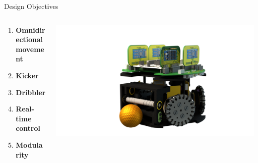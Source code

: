 \begin{frame}{Design Objectives}
	\begin{columns}[T]
		\begin{column}{0.5\textwidth}

			\begin{enumerate}

				\item \textbf{Omnidirectional movement}


				\item \textbf{Kicker}

				\item \textbf{Dribbler}

				\item \textbf{Real-time control}

				\item \textbf{Modularity}

			\end{enumerate}
		\end{column}
		\begin{column}{0.5\textwidth}
			\begin{adjustbox}{scale=2,center,margin={-1cm,3cm,2cm,0cm}}
				\includegraphics[width=\textwidth]{image/png/robot_base.png}
			\end{adjustbox}
		\end{column}
	\end{columns}
\end{frame}
